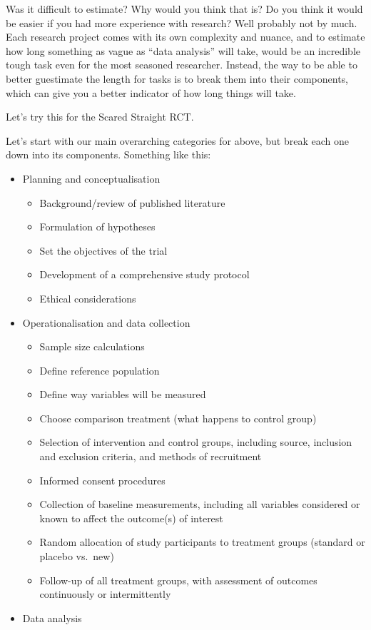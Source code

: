 \documentclass[
]{book}
\providecommand{\tightlist}{%
  \setlength{\itemsep}{0pt}\setlength{\parskip}{0pt}}
\begin{document}
Was it difficult to estimate? Why would you think that is? Do you think it would be easier if you had more experience with research? Well probably not by much. Each research project comes with its own complexity and nuance, and to estimate how long something as vague as ``data analysis'' will take, would be an incredible tough task even for the most seasoned researcher. Instead, the way to be able to better guestimate the length for tasks is to break them into their components, which can give you a better indicator of how long things will take.

Let's try this for the Scared Straight RCT.

Let's start with our main overarching categories for above, but break each one down into its components. Something like this:

\begin{itemize}
\tightlist
\item
  Planning and conceptualisation

  \begin{itemize}
  \tightlist
  \item
    Background/review of published literature
  \item
    Formulation of hypotheses
  \item
    Set the objectives of the trial
  \item
    Development of a comprehensive study protocol
  \item
    Ethical considerations
  \end{itemize}
\item
  Operationalisation and data collection

  \begin{itemize}
  \tightlist
  \item
    Sample size calculations
  \item
    Define reference population
  \item
    Define way variables will be measured
  \item
    Choose comparison treatment (what happens to control group)
  \item
    Selection of intervention and control groups, including source, inclusion and exclusion criteria, and methods of recruitment
  \item
    Informed consent procedures
  \item
    Collection of baseline measurements, including all variables considered or known to affect the outcome(s) of interest
  \item
    Random allocation of study participants to treatment groups (standard or placebo vs.~new)
  \item
    Follow-up of all treatment groups, with assessment of outcomes continuously or intermittently
  \end{itemize}
\item
  Data analysis


\end{itemize}
\end{document}
